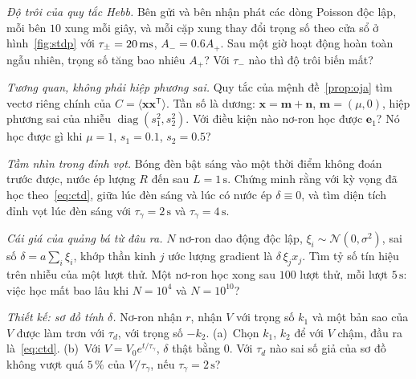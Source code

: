 \begin{exercise}[\lvlA]
\label{ex:06:2}
\emph{Độ trôi của quy tắc Hebb.} Bên gửi và bên nhận phát các dòng Poisson độc lập, mỗi bên $10$ xung mỗi giây, và mỗi cặp xung thay đổi trọng số theo cửa sổ ở hình~\ref{fig:stdp} với $\tau_\pm=20\,\text{ms}$, $A_-=0.6A_+$. Sau một giờ hoạt động hoàn toàn ngẫu nhiên, trọng số tăng bao nhiêu $A_+$? Với $\tau_-$ nào thì độ trôi biến mất?
\end{exercise}

\begin{exercise}[\lvlB]
\label{ex:06:3}
\emph{Tương quan, không phải hiệp phương sai.} Quy tắc của mệnh đề~\ref{prop:oja} tìm vectơ riêng chính của $C=\langle\mathbf x\mathbf x^{\mathsf T}\rangle$. Tần số là dương: $\mathbf x=\mathbf m+\mathbf n$, $\mathbf m=(\mu,0)$, hiệp phương sai của nhiễu $\operatorname{diag}(s_1^2,s_2^2)$. Với điều kiện nào nơ-ron học được $\mathbf e_1$? Nó học được gì khi $\mu=1$, $s_1=0.1$, $s_2=0.5$?
\end{exercise}

\begin{exercise}[\lvlA]
\label{ex:06:4}
\emph{Tầm nhìn trong đỉnh vọt.} Bóng đèn bật sáng vào một thời điểm không đoán trước được, nước ép lượng $R$ đến sau $L=1\,\text{s}$. Chứng minh rằng với kỳ vọng đã học theo~\eqref{eq:ctd}, giữa lúc đèn sáng và lúc có nước ép $\delta\equiv0$, và tìm diện tích đỉnh vọt lúc đèn sáng với $\tau_\gamma=2\,\text{s}$ và $\tau_\gamma=4\,\text{s}$.
\end{exercise}

\begin{exercise}[\lvlB]
\label{ex:06:5}
\emph{Cái giá của quảng bá từ đâu ra.} $N$ nơ-ron dao động độc lập, $\xi_i\sim\mathcal N(0,\sigma^2)$, sai số $\delta=a\sum_i\xi_i$, khớp thần kinh $j$ ước lượng gradient là $\delta\,\xi_jx_j$. Tìm tỷ số tín hiệu trên nhiễu của một lượt thử. Một nơ-ron học xong sau $100$ lượt thử, mỗi lượt $5\,\text{s}$: việc học mất bao lâu khi $N=10^4$ và $N=10^{10}$?
\end{exercise}

\begin{exercise}[\lvlB]
\label{ex:06:6}
\emph{Thiết kế: sơ đồ tính $\delta$.} Nơ-ron  nhận $r$, nhận $V$ với trọng số $k_1$ và một bản sao của $V$ được làm trơn với $\tau_d$, với trọng số $-k_2$. (a)~Chọn $k_1$, $k_2$ để với $V$ chậm, đầu ra là~\eqref{eq:ctd}. (b)~Với $V=V_0e^{t/\tau_\gamma}$, $\delta$ thật bằng $0$. Với $\tau_d$ nào sai số giả của sơ đồ không vượt quá $5\,\%$ của $V/\tau_\gamma$, nếu $\tau_\gamma=2\,\text{s}$?
\end{exercise}

